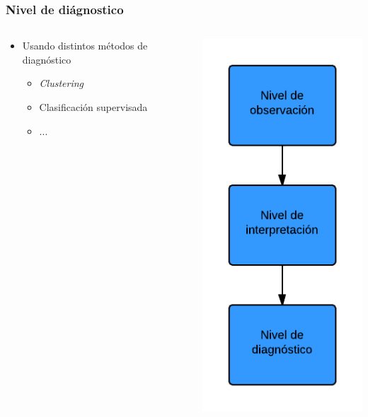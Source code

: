 \begin{frame}
	\frametitle{Nivel de di\'agnostico}
	
	\begin{columns}[T] %
		\begin{column}[T]{5cm} %
			\begin{itemize}
				\item Usando distintos m\'etodos de diagn\'ostico
				\begin{itemize}
					\item \textit{Clustering}
					\item Clasificaci\'on supervisada
					\item ...
				\end{itemize}
			\end{itemize}
		\end{column}
		\begin{column}[T]{5cm} %
			\includegraphics[width=0.5\linewidth]{./Figures/NivelDeDiagnostico.png}
		\end{column}
	\end{columns}
\end{frame}